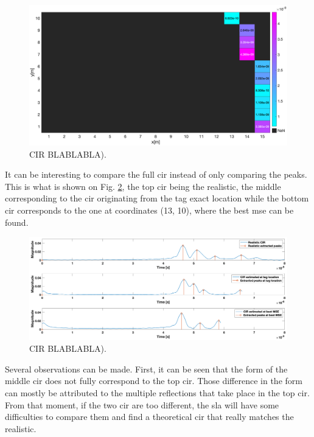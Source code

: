 \begin{figure}[H]
\centering
\includegraphics[width=\linewidth]{Images/no_name_1.png}
\caption{CIR BLABLABLA). \label{fig:mse_analysis}}
\end{figure}

It can be interesting to compare the full \gls{cir} instead of only comparing the peaks. This is what is shown on Fig. \ref{fig:cir_compa}, the top \gls{cir} being the realistic, the middle corresponding to the \gls{cir} originating from the tag exact location while the bottom \gls{cir} corresponds to the one at coordinates (13, 10), where the best \gls{mse} can be found.

\begin{figure}[H]
\centering
\includegraphics[width=\linewidth]{Images/no_name_2.png}
\caption{CIR BLABLABLA). \label{fig:cir_compa}}
\end{figure}

Several observations can be made. First, it can be seen that the form of the middle \gls{cir} does not fully correspond to the top \gls{cir}. Those difference in the form can mostly be attributed to the multiple reflections that take place in the top \gls{cir}. From that moment, if the two \gls{cir} are too different, the \gls{sla} will have some difficulties to compare them and find a theoretical \gls{cir} that really matches the realistic.
\vspace{2mm}

